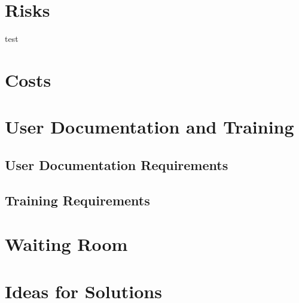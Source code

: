 \documentclass{article}
\begin{document}
\section{Risks}
\quad test
\section{Costs}
\section{User Documentation and Training}
\subsection{User Documentation Requirements}
\subsection{Training Requirements}
\section{Waiting Room}
\section{Ideas for Solutions}
\end{document}
